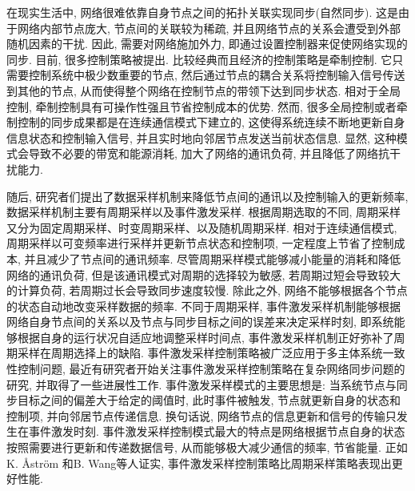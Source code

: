在现实生活中, 网络很难依靠自身节点之间的拓扑关联实现同步(自然同步). 这是由于网络内部节点庞大, 节点间的关联较为稀疏, 并且网络节点的关系会遭受到外部随机因素的干扰. 因此, 需要对网络施加外力, 即通过设置控制器来促使网络实现的同步.
目前, 很多控制策略被提出. 比较经典而且经济的控制策略是牵制控制. 它只需要控制系统中极少数重要的节点, 然后通过节点的耦合关系将控制输入信号传送到其他的节点, 从而使得整个网络在控制节点的带领下达到同步状态. 相对于全局控制, 牵制控制具有可操作性强且节省控制成本的优势.
然而, 很多全局控制或者牵制控制的同步成果都是在连续通信模式下建立的, 这使得系统连续不断地更新自身信息状态和控制输入信号, 并且实时地向邻居节点发送当前状态信息. 显然, 这种模式会导致不必要的带宽和能源消耗, 加大了网络的通讯负荷, 并且降低了网络抗干扰能力.

随后, 研究者们提出了数据采样机制来降低节点间的通讯以及控制输入的更新频率, 数据采样机制主要有周期采样以及事件激发采样. 根据周期选取的不同, 周期采样又分为固定周期采样、时变周期采样、以及随机周期采样. 相对于连续通信模式, 周期采样以可变频率进行采样并更新节点状态和控制项, 一定程度上节省了控制成本, 并且减少了节点间的通讯频率. 尽管周期采样模式能够减小能量的消耗和降低网络的通讯负荷, 但是该通讯模式对周期的选择较为敏感, 若周期过短会导致较大的计算负荷, 若周期过长会导致同步速度较慢. 除此之外, 网络不能够根据各个节点的状态自动地改变采样数据的频率. 不同于周期采样, 事件激发采样机制能够根据网络自身节点间的关系以及节点与同步目标之间的误差来决定采样时刻, 即系统能够根据自身的运行状况自适应地调整采样时间点, 事件激发采样机制正好弥补了周期采样在周期选择上的缺陷. 事件激发采样控制策略被广泛应用于多主体系统一致性控制问题, 最近有研究者开始关注事件激发采样控制策略在复杂网络同步问题的研究, 并取得了一些进展性工作. 事件激发采样模式的主要思想是: 当系统节点与同步目标之间的偏差大于给定的阈值时, 此时事件被触发, 节点就更新自身的状态和控制项, 并向邻居节点传递信息. 换句话说, 网络节点的信息更新和信号的传输只发生在事件激发时刻. 事件激发采样控制模式最大的特点是网络根据节点自身的状态按照需要进行更新和传递数据信号, 从而能够极大减少通信的频率, 节省能量. 正如K. {\AA}ström 和B. Wang等人证实, 事件激发采样控制策略比周期采样策略表现出更好性能.

